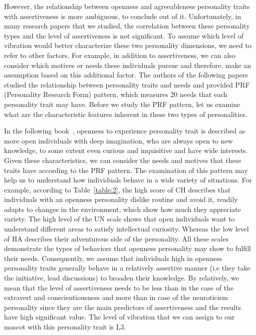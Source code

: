 However, the relationship between openness and agreeableness personality traits with
assertiveness is more ambiguous, to conclude out of it.
Unfortunately, in many research papers that we studied, the correlation between these
personality types and the level of assertiveness is not significant.
To assume which level of vibration would better characterize
these two personality dimensions, we need to refer to other factors.
For example, in addition to assertiveness, we can also consider which motives or needs these
individuals pursue and therefore, make an assumption based on this additional factor.
The authors of the following papers~\cite{costa1988catalog} studied the relationship between
personality traits and needs and provided PRF (Personality Research Form) pattern,
which measures 20 needs that each personality trait may have.
Before we study the PRF pattern, let us examine what are the characteristic features
inherent in these two types of personalities.

In the following book~\cite{matthews2003personality}, openness to experience
personality trait is described as more open individuals with deep imagination,
who are always open to new knowledge, to some extent even curious and inquisitive and have wide interests.
Given these characteristics, we can consider the needs and motives that these traits have according to the PRF pattern.
The examination of this pattern may help us to understand how individuals behave in a wide variety of situations.
For example, according to Table~\ref{table:2}, the high score of CH describes that
individuals with an openness personality dislike routine and avoid it, readily adapts to changes
in the environment, which show how much they appreciate variety.
The high level of the UN scale shows that open individuals want to understand
different areas to satisfy intellectual curiosity.
Whereas the low level of HA describes their adventurous side of the personality.
All these scales demonstrate the types of behaviors that openness personality may show to fulfill their needs.
Consequently, we assume that individuals high in openness
personality traits generally behave in a relatively assertive manner
(i.e they take the initiative, lead discussions) to broaden their knowledge.
By relatively, we mean that the level of assertiveness needs to be less than in the case of the
extravert and conscientiousness and more than in case of the neuroticism personality since they are the
main predictors of assertiveness and the results have high significant value.
The level of vibration that we can assign to our mascot with this personality trait is L3.


